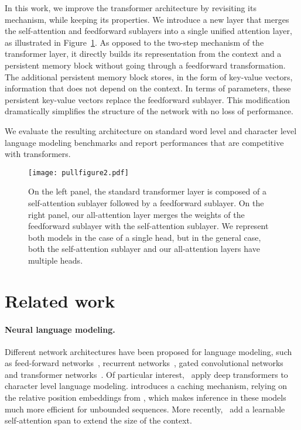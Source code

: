 \documentclass{article}
\begin{document}
In this work, we improve the transformer architecture by revisiting its mechanism, while keeping its properties.
We introduce a new layer that merges the self-attention and feedforward sublayers into a single unified attention layer, as illustrated in Figure~\ref{fig:pullfigure}.
As opposed to the two-step mechanism of the transformer layer, it directly builds its representation from the context and a persistent memory block without going through a feedforward transformation.
The additional persistent memory block stores, in the form of key-value vectors, information that does not depend on the context.
In terms of parameters, these persistent key-value vectors replace the feedforward sublayer.
This modification dramatically simplifies the structure of the network with no loss of performance.

We evaluate the resulting architecture on standard word level and character level language modeling benchmarks and report performances that are competitive with transformers.
 
\begin{figure}[t]
    \texttt{[image: pullfigure2.pdf]}
  \caption{On the left panel, the standard transformer layer is composed of a self-attention sublayer followed by a feedforward sublayer.
  On the right panel, our all-attention layer merges the weights of the feedforward sublayer with the self-attention sublayer.
  We represent both models in the case of a single head, but in the general case, both the self-attention sublayer and our all-attention layers have multiple heads.}
  \label{fig:pullfigure}
\end{figure}

\section{Related work}
\label{sec:related}

\paragraph{Neural language modeling.}
Different network architectures have been proposed for language modeling, such as feed-forward networks~\cite{bengio2003neural},
recurrent networks~\cite{mikolov2010recurrent}, gated convolutional networks~\cite{dauphin2017language} and transformer networks~\cite{vaswani2017attention}.
Of particular interest,~\citet{al2018character} apply deep transformers to character level language modeling.
\citet{dai2019transformer} introduces a caching mechanism, relying on the relative position embeddings from \citet{shaw2018self},
which makes inference in these models much more efficient for unbounded sequences.
More recently,~\citet{sukhbaatar2019adaptive} add a learnable self-attention span to extend the size of the context.
\end{document}
